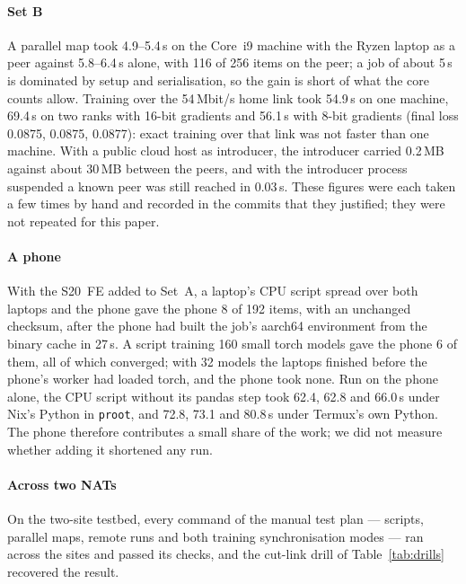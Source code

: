 \documentclass[5p,times,twocolumn]{elsarticle}
\begin{document}
\paragraph{Set B} A parallel map took 4.9--5.4\,s on the Core~i9 machine with
the Ryzen laptop as a peer against 5.8--6.4\,s alone, with 116 of 256 items on
the peer; a job of about 5\,s is dominated by setup and serialisation, so the
gain is short of what the core counts allow. Training over the 54\,Mbit/s home
link took 54.9\,s on one machine, 69.4\,s on two ranks with 16-bit gradients
and 56.1\,s with 8-bit gradients (final loss 0.0875, 0.0875, 0.0877): exact
training over that link was not faster than one machine. With a public cloud
host as introducer, the introducer carried 0.2\,MB against about 30\,MB between
the peers, and with the introducer process suspended a known peer was still
reached in 0.03\,s. These figures were each taken a few times by hand and
recorded in the commits that they justified; they were not repeated for this
paper.

\paragraph{A phone} With the S20~FE added to Set~A, a laptop's CPU script spread
over both laptops and the phone gave the phone 8 of 192 items, with an
unchanged checksum, after the phone had built the job's aarch64 environment
from the binary cache in 27\,s. A script training 160 small torch models gave
the phone 6 of them, all of which converged; with 32 models the laptops
finished before the phone's worker had loaded torch, and the phone took none.
Run on the phone alone, the CPU script without its pandas step took 62.4, 62.8
and 66.0\,s under Nix's Python in \texttt{proot}, and 72.8, 73.1 and 80.8\,s
under Termux's own Python. The phone therefore contributes a small share of the
work; we did not measure whether adding it shortened any run.

\paragraph{Across two NATs} On the two-site testbed, every command of the
manual test plan --- scripts, parallel maps, remote runs and both training
synchronisation modes --- ran across the sites and passed its checks, and the
cut-link drill of Table~\ref{tab:drills} recovered the result.
\end{document}
